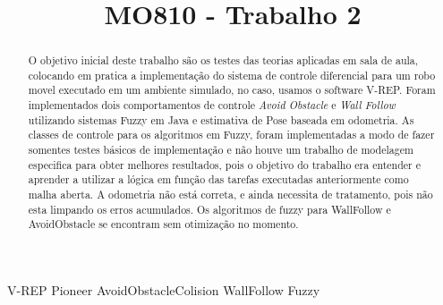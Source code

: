 \documentclass[twoside,conference,a4paper]{IEEEtran}
\begin{document}
\renewcommand{\IEEEkeywordsname}{Palavras-chave}


\title{MO810 - Trabalho 2}
\author{%
}


\maketitle

\begin{abstract}
O objetivo inicial deste trabalho são os testes das teorias aplicadas em sala de aula, colocando em pratica a implementação do sistema de controle diferencial para um robo movel executado em um ambiente simulado, no caso, usamos o software V-REP. Foram implementados dois comportamentos de controle \textit{Avoid Obstacle} e \textit{Wall Follow} utilizando sistemas Fuzzy em Java e estimativa de Pose baseada em odometria.
As classes de controle para os algoritmos em Fuzzy, foram implementadas a modo de fazer somentes testes básicos de implementação e não houve um trabalho de modelagem especifica para obter melhores resultados, pois o objetivo do trabalho era entender e aprender a utilizar a lógica em função das tarefas executadas anteriormente como malha aberta. A odometria não está correta, e ainda necessita de tratamento, pois não esta limpando os erros acumulados.
Os algoritmos de fuzzy para WallFollow e AvoidObstacle se encontram sem otimização no momento.

\end{abstract}

\begin{IEEEkeywords}
 V-REP Pioneer AvoidObstacleColision WallFollow Fuzzy
\end{IEEEkeywords}
\end{document}
